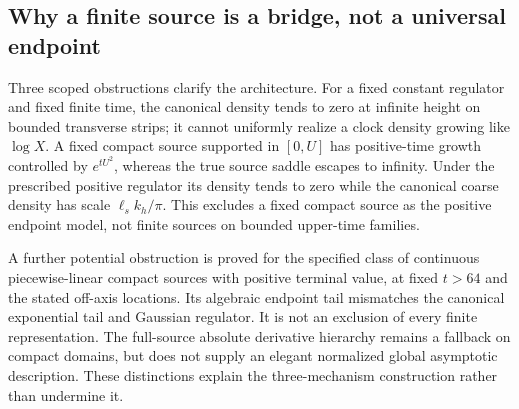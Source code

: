 \subsection{Why a finite source is a bridge, not a universal endpoint}
Three scoped obstructions clarify the architecture. For a fixed
constant regulator and fixed finite time, the canonical density tends
to zero at infinite height on bounded transverse strips; it cannot
uniformly realize a clock density growing like $\log X$. A fixed
compact source supported in $[0,U]$ has positive-time growth controlled
by $e^{tU^2}$, whereas the true source saddle escapes to infinity.
Under the prescribed positive regulator its density tends to zero
while the canonical coarse density has scale $\ell_s k_h/\pi$.
This excludes a fixed compact source as the positive endpoint model,
not finite sources on bounded upper-time families.

A further potential obstruction is proved for the specified class of
continuous piecewise-linear compact sources with positive terminal
value, at fixed $t>64$ and the stated off-axis locations. Its algebraic
endpoint tail mismatches the canonical exponential tail and Gaussian
regulator. It is not an exclusion of every finite representation.
The full-source absolute derivative hierarchy remains a fallback on
compact domains, but does not supply an elegant normalized global
asymptotic description. These distinctions explain the three-mechanism
construction rather than undermine it.
